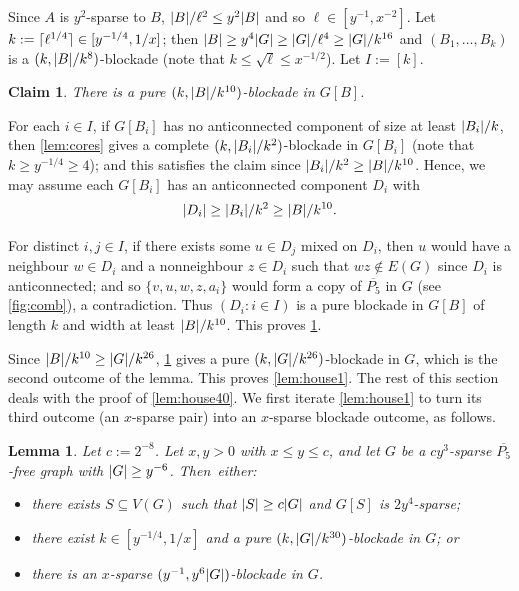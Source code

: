 \documentclass[11pt,reqno,a4paper]{amsart}
\newtheorem{lemma}[theorem]{Lemma}
\newtheorem{claim}{Claim}[theorem]
\let\oldendproof\endproof
\renewenvironment{proof}[1][\proofname]{%
	\oldproof[\normalfont\bfseries #1]%
}{\oldendproof}
\renewcommand{\qedsymbol}{$\blacksquare$}%
\newenvironment{subproof}[1][\normalfont\it Subproof]{%
	\renewcommand{\qedsymbol}{$\square$}%
	\begin{proof}[#1]%
	}{%
	\end{proof}%
}
\newcommand{\nin}{\notin}
\renewcommand{\subset}{\subseteq}
\DeclarePairedDelimiter\abs{\lvert}{\rvert}%
\DeclarePairedDelimiter\ceil{\lceil}{\rceil}%
\begin{document}
\begin{proof}
		Since $A$ is $y^2$-sparse to $B$, $\abs B/\ell^2\le y^2\abs B$ and so $\ell\in [y^{-1},x^{-2}]$.
		Let $k:=\ceil{\ell^{1/4}}\in[y^{-1/4},1/x]$; then $\abs B\ge y^4\abs G\ge \abs G/\ell^4
		\ge\abs G/k^{16}$ and $(B_1,\ldots,B_{k})$ is a $(k,\abs B/k^{8})$-blockade
		(note that $k\le\sqrt\ell\le x^{-1/2}$).
		Let $I:=[k]$.
		\begin{claim}
			\label{claim:pure}
			There is a pure $(k,\abs B/k^{10})$-blockade in $G[B]$.
		\end{claim}
		\begin{subproof}
			For each $i\in I$, if $G[B_i]$ has no anticonnected component of size at least $\abs{B_i}/k$, then \cref{lem:cores} gives a complete $( k,\abs{B_i}/k^2)$-blockade in $G[B_i]$ (note that $k\ge y^{-1/4}\ge 4$);
			and this satisfies the claim since $\abs{B_i}/k^2\ge \abs B/k^{10}$.
			Hence, we may assume each $G[B_i]$ has an anticonnected component $D_i$ with 
			\[\abs{D_i}\ge\abs{B_i}/k^2\ge\abs B/k^{10}.\]
			
			For distinct $i,j\in I$, if there exists some $u\in D_j$ mixed on $D_i$, then $u$ would have a neighbour $w\in D_i$ and a nonneighbour $z\in D_i$ such that $wz\nin E(G)$ since $D_i$ is anticonnected; and so $\{v,u,w,z,a_i\}$ would form a copy of $\overline{P_5}$ in $G$ (see \cref{fig:comb}), a contradiction.
			Thus $(D_i:i\in I)$ is a pure blockade in $G[B]$ of length $k$ and width at least $\abs B/k^{10}$.
			This proves \cref{claim:pure}.
		\end{subproof}
		
		Since $\abs B/k^{10}\ge \abs G/k^{26}$, \cref{claim:pure} gives a pure $(k,\abs G/k^{26})$-blockade in $G$, which is the second outcome of the lemma.
		This proves \cref{lem:house1}.
	\end{proof}
	The rest of this section deals with the proof of \cref{lem:house40}.
	We first iterate \cref{lem:house1} to turn its third outcome (an $x$-sparse pair) into an $x$-sparse blockade outcome, as follows.
	\begin{lemma}
		\label{lem:house2}
		Let $c:=2^{-8}$.
		Let $x,y>0$ with $x\le y\le c$,
		and let $G$ be a $cy^3$-sparse $\overline{P_5}$-free graph with $\abs G\ge y^{-6}$. Then~either:
		\begin{itemize}
			\item there exists $S\subset V(G)$ such that $\abs S\ge c\abs G$ and $G[S]$ is $2y^4$-sparse;
			
			\item there exist $k\in[y^{-1/4},1/x]$ and a pure $(k,\abs G/k^{30})$-blockade in $G$; or
			
			\item there is an $x$-sparse $(y^{-1},{y^6\abs G})$-blockade in $G$.
		\end{itemize}
	\end{lemma}
\end{document}
